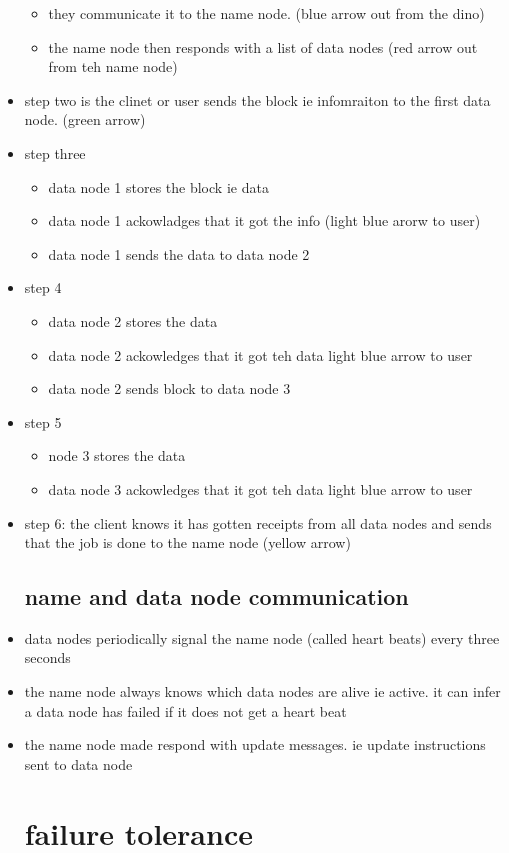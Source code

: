\documentclass{article}
\begin{document}
\begin{itemize}
\begin{itemize}
\item they communicate it to the name node. (blue arrow out from the dino) 
\item the name node then responds with a list of data nodes (red arrow out from teh name node)
\end{itemize}
\item step two
is the clinet or user sends the block ie infomraiton to the first data node. (green arrow)
\item step three
\begin{itemize}
    \item data node 1 stores the block ie data
    \item data node 1 ackowladges that it got the info (light blue arorw to user)
    \item data node 1 sends the data to data node 2
\end{itemize}
\item step 4
\begin{itemize}
    \item data node 2 stores the data
    \item data node 2 ackowledges that it got teh data light blue arrow to user
    \item data node 2 sends block to data node 3
\end{itemize}
\item step 5
\begin{itemize}
    \item   node 3 stores the data
    \item data node 3 ackowledges that it got teh data light blue arrow to user
\end{itemize}
\item step 6: the client knows it has gotten receipts from all data nodes and sends that the job is done to the name node (yellow arrow) 
\subsection{name and data node communication }
\item data nodes periodically signal the name node (called heart beats) every three seconds
\item the name node always knows which data nodes are alive ie active. it can infer a data node has failed if it does not get a heart beat 
\item the name node made respond with update messages. ie update instructions sent to data node
\section{failure tolerance}

\end{itemize}
\end{document}
